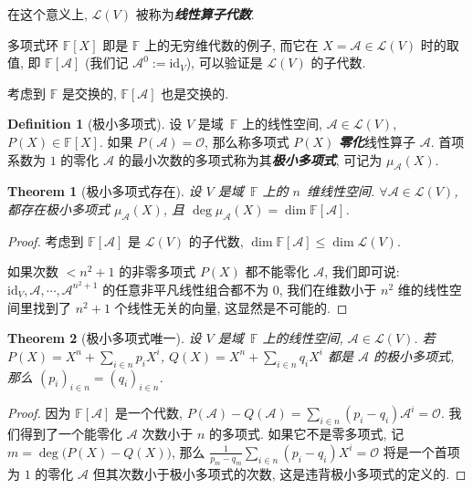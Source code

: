 \documentclass[openany]{ctexbook}
\newcommand*{\indexbf}[1]{\emph{\textbf{#1}}\index{#1}} %
\theoremstyle{plain}
\newtheorem{theorem}{Theorem}[section] %
\theoremstyle{definition}
\newtheorem{definition}{Definition}[section] %
\newcommand*{\id}{\mathrm{id}} %
\begin{document}
在这个意义上, $\mathcal L(V)$ 被称为\indexbf{线性算子代数}.

多项式环 $\mathbb F[X]$ 即是 $\mathbb F$ 上的无穷维代数的例子, 而它在 $X = \mathscr A \in \mathcal L(V)$ 时的取值, 即 $\mathbb F[\mathscr A]$ (我们记 $\mathscr A^0 := \id_V$), 可以验证是 $\mathcal L(V)$ 的子代数.

考虑到 $\mathbb F$ 是交换的, $\mathbb F[\mathscr A]$ 也是交换的. 

\begin{definition}[极小多项式]
	设 $V$ 是域~$\mathbb F$ 上的线性空间, $\mathscr A \in \mathcal L(V)$, $P(X) \in \mathbb F[X]$.
	如果 $P(\mathscr A) = \mathscr O$, 那么称多项式 $P(X)$ \indexbf{零化}线性算子 $\mathscr A$. 首项系数为 $1$ 的零化 $\mathscr A$ 的最小次数的多项式称为其\indexbf{极小多项式}, 可记为 $\mu_{\mathscr A}(X)$.
\end{definition}

\begin{theorem}[极小多项式存在]
	设 $V$ 是域~$\mathbb F$ 上的 $n$~维线性空间. 
	$\forall \mathscr A \in \mathcal L(V)$, 都存在极小多项式 $\mu_\mathscr A (X)$, 且 $\deg \mu_{\mathscr A} (X) = \dim \mathbb F[\mathscr A]$.
\end{theorem}
\begin{proof}
	考虑到 $\mathbb F[\mathscr A]$ 是 $\mathcal L(V)$ 的子代数, $\dim \mathbb F[\mathscr A] \leq \dim \mathcal L(V)$. 

	如果次数 $< n^2 + 1$ 的非零多项式 $P(X)$ 都不能零化 $\mathscr A$, 我们即可说: 
	$\id_V, \mathscr A, \cdots, \mathscr A^{n^2 + 1}$ 的任意非平凡线性组合都不为 $0$, 我们在维数小于 $n^2$ 维的线性空间里找到了 $n^2 + 1$ 个线性无关的向量, 这显然是不可能的.
\end{proof}

\begin{theorem}[极小多项式唯一]
	设 $V$ 是域~$\mathbb F$ 上的线性空间, $\mathscr A \in \mathcal L(V)$. 
	若 $P(X) = X^n + \sum_{i \in n} p_i X^i$, $Q(X) = X^n + \sum_{i \in n} q_i X^i$ 都是 $\mathscr A$ 的极小多项式, 那么 $(p_i)_{i \in n} = (q_i)_{i \in n}$.
\end{theorem}
\begin{proof}
	因为 $\mathbb F[\mathscr A]$ 是一个代数, $P(\mathscr A) - Q(\mathscr A) = \sum_{i \in n} (p_i - q_i) \mathscr A^i = \mathscr O$. 
	我们得到了一个能零化 $\mathscr A$ 次数小于 $n$ 的多项式. 
	如果它不是零多项式, 记 $m = \deg \big( P(X) - Q(X)\big)$, 那么 $\frac{1}{p_m - q_m} \sum_{i \in n} (p_i - q_i) X^i = \mathscr O$ 将是一个首项为 $1$ 的零化 $\mathscr A$ 但其次数小于极小多项式的次数, 这是违背极小多项式的定义的.
\end{proof}
\end{document}
